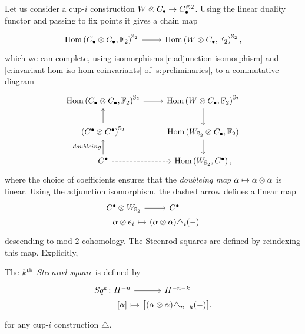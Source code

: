 Let us consider a cup-$i$ construction $W \otimes C_\bullet \to C_\bullet^{\otimes 2}$.
Using the linear duality functor and passing to fix points it gives a chain map
\begin{equation*}
\begin{tikzcd}
\Hom\left(C_\bullet \ot C_\bullet, \Ftwo \right)^{\Sym_2} \arrow[r] &
\Hom\left(W \ot C_\bullet, \Ftwo \right)^{\Sym_2},
\end{tikzcd}
\end{equation*}
which we can complete, using isomorphisms \eqref{e:adjunction isomorphism} and \eqref{e:invariant hom iso hom coinvariants} of \cref{s:preliminaries}, to a commutative diagram
\begin{equation*}
\begin{tikzcd}
\Hom\left(C_\bullet \ot C_\bullet, \Ftwo \right)^{\Sym_2} \arrow[r] &
\Hom\left(W \ot C_\bullet, \Ftwo \right)^{\Sym_2} \arrow[d] \\
\left(C^\bullet \ot C^\bullet\right)^{\Sym_2} \arrow[u]&
\Hom\left(W_{\Sym_2} \ot C_\bullet, \Ftwo \right) \arrow[d] \\
C^\bullet \arrow[u, "doubleing"] \arrow[r, dashed]&
\Hom\left(W_{\Sym_2}, C^\bullet\right),
\end{tikzcd}
\end{equation*}
where the choice of coefficients ensures that the \textit{doubleing map} $\alpha \mapsto \alpha \otimes \alpha$ is linear.
Using the adjunction isomorphism, the dashed arrow defines a linear map
\begin{equation} \label{e:Steenrod squares parameterized}
\begin{tikzcd}[row sep=0pt, column sep = small]
C^\bullet \ot W_{\Sym_2} \arrow[r] &[-10pt] C^\bullet \\
\alpha \ot e_i \arrow[r, |->] & (\alpha \ot \alpha)\triangle_i(-)
\end{tikzcd}
\end{equation}
descending to mod $2$ cohomology.
The Steenrod squares are defined by reindexing this map.
Explicitly,
\begin{definition} \label{d:steenrod squares}
	The \textit{$k^{\mathrm{th}}$ Steenrod square} is defined by
	\begin{equation} \label{e:steenrod squares}
	\begin{tikzcd}[row sep=0pt, column sep=tiny]
	Sq^k \colon H^{-n} \arrow[r] & H^{-n-k} \\
	\phantom{Sq^k \colon}{[\alpha]} \arrow[r, |->] & \big[ (\alpha \ot \alpha)\triangle_{n-k}(-) \big].
	\end{tikzcd}
	\end{equation}
	for any cup-$i$ construction $\triangle$.
\end{definition}

